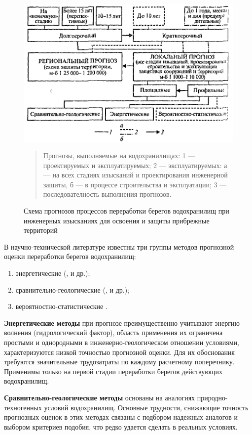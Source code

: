 \documentclass[732,14pt,final]{studrep}
\begin{document}
  \begin{figure}[htp]
	\begin{center}
	\includegraphics[width=0.8\linewidth]{pics/image4.png}
  \end{center}
  \begin{quote}  
    Прогнозы, выполняемые на водохранилищах: 1 — проектируемых и эксплуатируемых; 2 — эксплуатируемых: а — на всех стадиях изысканий и проектирования инженерной защиты, б — в процессе строительства и эксплуатации; 3 — последователность выполнения прогнозов.
  \end{quote}
  \caption{Схема прогнозов процессов переработки берегов водохранилищ при инженерных изысканиях для освоения и защиты прибрежные территорий~\cite{rec86}}
    \label{fig:prognosys-schema}
  \end{figure}

В научно-технической литературе известны три группы методов прогнозной оценки переработки берегов водохранилищ:
\begin{enumerate}
\item энергетические (\cite{b22}, \cite{b23} и др.);
\item сравнительно-геологические (\cite{b18}, \cite{b19} и др.);
\item вероятностно-статистические \cite{b20}.
\end{enumerate}

\textbf{Энергетические методы} при прогнозе преимущественно учитывают энергию волнения (гидрологический фактор), область применения их ограничена простыми и однородными в инженерно-геологическом отношении условиями, характеризуются низкой точностью прогнозной оценки. Для их обоснования требуются значительные трудозатраты по каждому расчетному поперечнику. Применимы только на первой стадии переработки берегов действующих водохранилищ.

\textbf{Сравнительно-геологические методы}  основаны на аналогиях природно-техногенных условий водохранилищ. Основные трудности, снижающие точность прогнозных оценок в этих методах связаны с подбором надежных аналогов и выбором критериев подобия, что редко удается сделать в реальных условиях.
\end{document}
